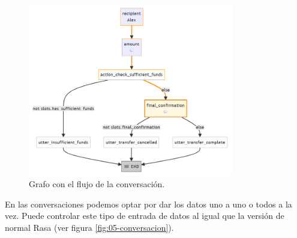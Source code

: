 \documentclass[a4paper,11pt]{article}
\begin{document}
			\begin{figure}[H]
				\centering
				\includegraphics[width=0.8\textwidth]{img/05-grafoFlujo.png}
				\caption{Grafo con el flujo de la conversación.}		
				\label{fig:04-grafoFlujo}
			\end{figure}
			
			En las conversaciones podemos optar por dar los datos uno a uno o todos a la vez. Puede controlar este tipo de entrada de datos al igual que la versión de normal Rasa (ver figura \ref{fig:05-conversacion}).
			
\end{document}
